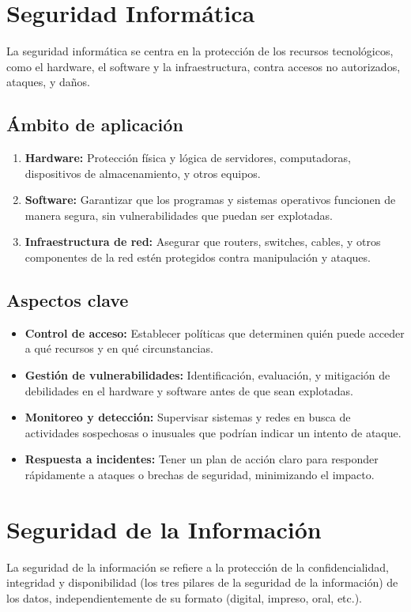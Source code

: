 \documentclass{article}
\begin{document}
\section{Seguridad Informática}
La seguridad informática se centra en la protección de los recursos tecnológicos, como el hardware, el software y la infraestructura, contra accesos no autorizados, ataques, y daños.
\subsection{Ámbito de aplicación}
\begin{enumerate}
    \item \textbf{Hardware:} Protección física y lógica de servidores, computadoras, dispositivos de almacenamiento, y otros equipos.
    \item \textbf{Software:} Garantizar que los programas y sistemas operativos funcionen de manera segura, sin vulnerabilidades que puedan ser explotadas.
    \item \textbf{Infraestructura de red:} Asegurar que routers, switches, cables, y otros componentes de la red estén protegidos contra manipulación y ataques.
\end{enumerate}

\subsection{Aspectos clave}
\begin{itemize}
    \item \textbf{Control de acceso:} Establecer políticas que determinen quién puede acceder a qué recursos y en qué circunstancias.
    \item \textbf{Gestión de vulnerabilidades:} Identificación, evaluación, y mitigación de debilidades en el hardware y software antes de que sean explotadas.
    \item \textbf{Monitoreo y detección:} Supervisar sistemas y redes en busca de actividades sospechosas o inusuales que podrían indicar un intento de ataque.
    \item \textbf{Respuesta a incidentes:} Tener un plan de acción claro para responder rápidamente a ataques o brechas de seguridad, minimizando el impacto.
\end{itemize}

\section{Seguridad de la Información}
La seguridad de la información se refiere a la protección de la confidencialidad, integridad y disponibilidad (los tres pilares de la seguridad de la información) de los datos, independientemente de su formato (digital, impreso, oral, etc.).
\end{document}
